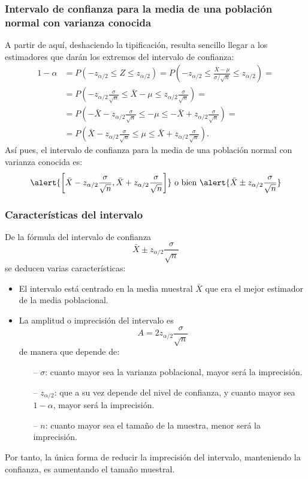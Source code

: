 \begin{frame}
\frametitle{Intervalo de confianza para la media de una población normal con varianza conocida}
A partir de aquí, deshaciendo la tipificación, resulta sencillo llegar a los estimadores que darán los extremos del intervalo de confianza:
\[
\begin{align*}
1-\alpha &= P(-z_{\alpha/2}\leq Z \leq z_{\alpha/2}) = P\left(-z_{\alpha/2}\leq \frac{\bar X -\mu}{\sigma/\sqrt{n}} \leq z_{\alpha/2}\right) =\\
&= P\left(-z_{\alpha/2}\frac{\sigma}{\sqrt{n}}\leq \bar X -\mu \leq z_{\alpha/2}\frac{\sigma}{\sqrt{n}}\right)=\\
&= P\left(-\bar{X}-z_{\alpha/2}\frac{\sigma}{\sqrt{n}}\leq -\mu \leq -\bar{X}+z_{\alpha/2}\frac{\sigma}{\sqrt{n}}\right)= \\
&= P\left(\bar{X}-z_{\alpha/2}\frac{\sigma}{\sqrt{n}}\leq \mu \leq \bar{X}+z_{\alpha/2}\frac{\sigma}{\sqrt{n}}\right).
\end{align*}
\]
Así pues, el intervalo de confianza para la media de una población normal con varianza conocida es:
\[
\alert{\left[\bar{X}-z_{\alpha/2}\frac{\sigma}{\sqrt{n}},\bar{X}+z_{\alpha/2}\frac{\sigma}{\sqrt{n}}\right]}
\mbox{ o bien }
\alert{\bar{X}\pm z_{\alpha/2}\frac{\sigma}{\sqrt{n}}}
\]
\end{frame}


\begin{frame}
\frametitle{Características del intervalo}
De la fórmula del intervalo de confianza
\[
\bar{X}\pm z_{\alpha/2}\frac{\sigma}{\sqrt{n}}
\]
se deducen varias características:
\begin{itemize}
\item El intervalo está centrado en la media muestral $\bar X$ que era el mejor estimador de la media poblacional.
\item La amplitud o imprecisión del intervalo es
\[
A= 2 z_{\alpha/2}\frac{\sigma}{\sqrt{n}}
\]
de manera que depende de:
\begin{itemize}
\item[--] $\sigma$: cuanto mayor sea la varianza poblacional, mayor será la imprecisión.
\item[--] $z_{\alpha/2}$: que a su vez depende del nivel de confianza, y cuanto mayor sea $1-\alpha$, mayor será la imprecisión.
\item[--] $n$: cuanto mayor sea el tamaño de la muestra, menor será la imprecisión.
\end{itemize}
\end{itemize}
Por tanto, la única forma de reducir la imprecisión del intervalo, manteniendo la confianza, es aumentando el tamaño muestral.
\end{frame}


